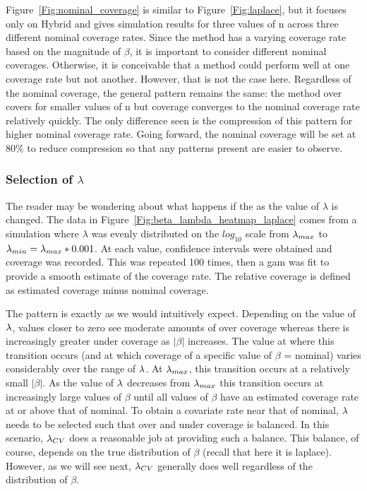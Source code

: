 Figure~\ref{Fig:nominal_coverage} is similar to Figure~\ref{Fig:laplace}, but it focuses only on Hybrid and gives simulation results for three values of n across three different nominal coverage rates. Since the method has a varying coverage rate based on the magnitude of $\beta$, it is important to consider different nominal coverages. Otherwise, it is conceivable that a method could perform well at one coverage rate but not another. However, that is not the case here. Regardless of the nominal coverage, the general pattern remains the same: the method over covers for smaller values of n but coverage converges to the nominal coverage rate relatively quickly. The only difference seen is the compression of this pattern for higher nominal coverage rate. Going forward, the nominal coverage will be set at $80\%$ to reduce compression so that any patterns present are easier to observe.

\subsubsection{Selection of \texorpdfstring{$\lambda$}{lambda}}

The reader may be wondering about what happens if the as the value of $\lambda$ is changed. The data in Figure~\ref{Fig:beta_lambda_heatmap_laplace} comes from a simulation where $\lambda$ was evenly distributed on the $log_{10}$ scale from $\lambda_{max}$ to $\lambda_{min} = \lambda_{max} * 0.001$. At each value, confidence intervals were obtained and coverage was recorded. This was repeated 100 times, then a gam was fit to provide a smooth estimate of the coverage rate. The relative coverage is defined as estimated coverage minus nominal coverage.

The pattern is exactly as we would intuitively expect. Depending on the value of $\lambda$, values closer to zero see moderate amounts of over coverage whereas there is increasingly greater under coverage as $|\beta|$ increases. The value at where this transition occurs (and at which coverage of a specific value of $\beta$ = nominal) varies considerably over the range of $\lambda$. At $\lambda_{max}$, this transition occurs at a relatively small $|\beta|$. As the value of $\lambda$ decreases from $\lambda_{max}$ this transition occurs at increasingly large values of $\beta$ until all values of $\beta$ have an estimated coverage rate at or above that of nominal. To obtain a covariate rate near that of nominal, $\lambda$ needs to be selected such that over and under coverage is balanced. In this scenario, $\lambda_{CV}$ does a reasonable job at providing such a balance. This balance, of course, depends on the true distribution of $\beta$ (recall that here it is laplace). However, as we will see next, $\lambda_{CV}$ generally does well regardless of the distribution of $\beta$.

